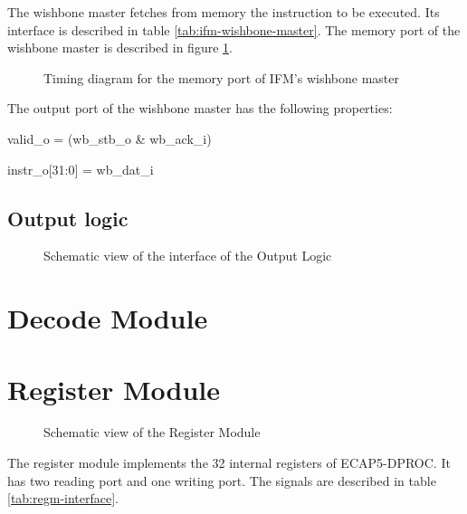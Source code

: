 \begin{content}
  The wishbone master fetches from memory the instruction to be executed. Its interface is described in table \ref{tab:ifm-wishbone-master}.
  The memory port of the wishbone master is described in figure \ref{fig:ifm-wishbone-read}. 
\end{content}



\begin{figure}[H]
  \centering
  
  \caption{Timing diagram for the memory port of IFM's wishbone master}
  \label{fig:ifm-wishbone-read}
\end{figure}

\begin{content}
  The output port of the wishbone master has the following properties:
  \begin{center}
    valid\_o = (wb\_stb\_o \& wb\_ack\_i)

    instr\_o[31:0] = wb\_dat\_i
  \end{center}
\end{content}

\subsection{Output logic}

\begin{figure}[H]
    \centering
    
    \caption{Schematic view of the interface of the Output Logic}
    \label{fig:ifm-output-logic}
\end{figure}

\newpage
\section{Decode Module}
\newpage

\section{Register Module}

\begin{figure}[h!]
    \centering
    
    \caption{Schematic view of the Register Module}
    \label{fig:regm}
\end{figure}

\begin{content}
The register module implements the 32 internal registers of ECAP5-DPROC. It has two reading port and one writing port. The signals are described in table \ref{tab:regm-interface}. 
\end{content}

